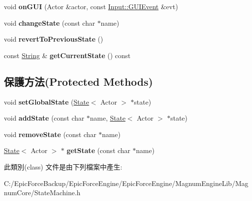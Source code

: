 \begin{DoxyCompactItemize}
\item 
void {\bfseries on\+G\+UI} (Actor \&actor, const \hyperlink{class_magnum_1_1_input_1_1_g_u_i_event}{Input\+::\+G\+U\+I\+Event} \&evt)\hypertarget{class_magnum_1_1_state_machine_a3ea7bb9a549878b8906cee7db84bac1a}{}\label{class_magnum_1_1_state_machine_a3ea7bb9a549878b8906cee7db84bac1a}

\item 
void {\bfseries change\+State} (const char $\ast$name)\hypertarget{class_magnum_1_1_state_machine_a0a61afa1577748993b3076263adbb81f}{}\label{class_magnum_1_1_state_machine_a0a61afa1577748993b3076263adbb81f}

\item 
void {\bfseries revert\+To\+Previous\+State} ()\hypertarget{class_magnum_1_1_state_machine_abd0941d90bd50c4967d2a9bc94e32ada}{}\label{class_magnum_1_1_state_machine_abd0941d90bd50c4967d2a9bc94e32ada}

\item 
const \hyperlink{class_magnum_1_1_string}{String} \& {\bfseries get\+Current\+State} () const \hypertarget{class_magnum_1_1_state_machine_a729bc7bf1574a8771f08198a4a031a29}{}\label{class_magnum_1_1_state_machine_a729bc7bf1574a8771f08198a4a031a29}

\end{DoxyCompactItemize}
\subsection*{保護方法(Protected Methods)}
\begin{DoxyCompactItemize}
\item 
void {\bfseries set\+Global\+State} (\hyperlink{class_magnum_1_1_state}{State}$<$ Actor $>$ $\ast$state)\hypertarget{class_magnum_1_1_state_machine_a39be3c9545ef10b98e63cb2fc1b67ee9}{}\label{class_magnum_1_1_state_machine_a39be3c9545ef10b98e63cb2fc1b67ee9}

\item 
void {\bfseries add\+State} (const char $\ast$name, \hyperlink{class_magnum_1_1_state}{State}$<$ Actor $>$ $\ast$state)\hypertarget{class_magnum_1_1_state_machine_a2e3249e3432473015d61d3a917a72c0e}{}\label{class_magnum_1_1_state_machine_a2e3249e3432473015d61d3a917a72c0e}

\item 
void {\bfseries remove\+State} (const char $\ast$name)\hypertarget{class_magnum_1_1_state_machine_aee58430d734b1d0f7bf98918ffcb3851}{}\label{class_magnum_1_1_state_machine_aee58430d734b1d0f7bf98918ffcb3851}

\item 
\hyperlink{class_magnum_1_1_state}{State}$<$ Actor $>$ $\ast$ {\bfseries get\+State} (const char $\ast$name)\hypertarget{class_magnum_1_1_state_machine_a8134dec0a703d699d17ce3befe2cf398}{}\label{class_magnum_1_1_state_machine_a8134dec0a703d699d17ce3befe2cf398}

\end{DoxyCompactItemize}


此類別(class) 文件是由下列檔案中產生\+:\begin{DoxyCompactItemize}
\item 
C\+:/\+Epic\+Force\+Backup/\+Epic\+Force\+Engine/\+Epic\+Force\+Engine/\+Magnum\+Engine\+Lib/\+Magnum\+Core/State\+Machine.\+h\end{DoxyCompactItemize}
